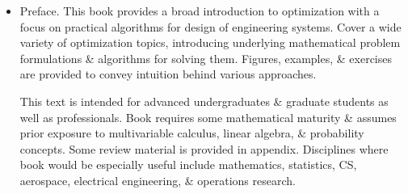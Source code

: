 \documentclass{article}
\begin{document}
\begin{itemize}
	\item {\sf Preface.} This book provides a broad introduction to optimization with a focus on practical algorithms for design of engineering systems. Cover a wide variety of optimization topics, introducing underlying mathematical problem formulations \& algorithms for solving them. Figures, examples, \& exercises are provided to convey intuition behind various approaches.
	
	This text is intended for advanced undergraduates \& graduate students as well as professionals. Book requires some mathematical maturity \& assumes prior exposure to multivariable calculus, linear algebra, \& probability concepts. Some review material is provided in appendix. Disciplines where book would be especially useful include mathematics, statistics, CS, aerospace, electrical engineering, \& operations research.
	

\end{itemize}
\end{document}
